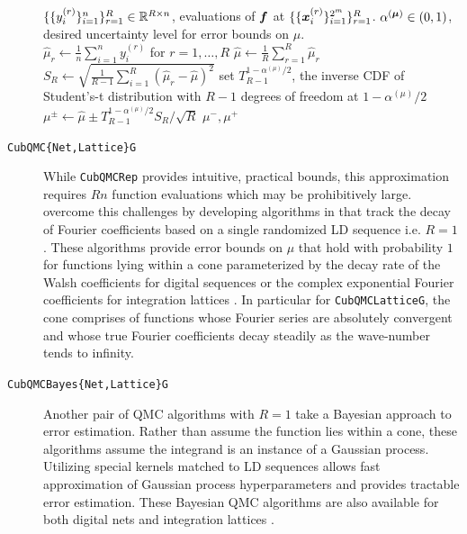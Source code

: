 \documentclass{article}[12pt]
\begin{document}
\begin{description}
\begin{algorithm}[h!]
\begin{algorithmic}
        \Require $\{\{y_i^{(r)}\}_{i=1}^n\}_{r=1}^R \in \bbR^{R \times n}$, evaluations of $\bf$ at $\{\{\bx_i^{(r)}\}_{i=1}^{2^m}\}_{r=1}^R$.
        \Require $\alpha^{(\bmu)} \in (0,1)$, desired uncertainty level for error bounds on $\mu$. \\
        \hrulefill
        \State $\hat{\mu}_r \gets \frac{1}{n} \sum_{i=1}^n y_i^{(r)}$ for $r=1,\dots,R$
        \State $\hat{\mu} \gets \frac{1}{R} \sum_{r=1}^R \hat{\mu}_r$
        \State $S_R \gets \sqrt{\frac{1}{R-1}\sum_{i=1}^R(\hat{\mu}_r - \hat{\mu})^2}$
        \State set $T_{R-1}^{1-\alpha^{(\mu)}/2}$, the inverse CDF of Student's-t distribution with $R-1$ degrees of freedom at $1-\alpha^{(\mu)}/2$
        \State $\mu^\pm \gets \hat{\mu} \pm T_{R-1}^{1-\alpha^{(\mu)}/2}S_R/\sqrt{R}$
        \State \Return $\mu^-,\mu^+$
        \end{algorithmic}
    \end{algorithm}
    \item[\texttt{CubQMC\{Net,Lattice\}G}] While \texttt{CubQMCRep} provides intuitive, practical bounds, this approximation requires $Rn$ function evaluations which may be prohibitively large. \citeauthor{cubqmclattice} overcome this challenges by developing algorithms in \cite{adaptive_qmc} that track the decay of Fourier coefficients based on a single randomized LD sequence i.e. $R=1$. These algorithms provide error bounds on $\mu$ that hold with probability $1$ for functions lying within a cone parameterized by the decay rate of the Walsh coefficients for digital sequences \cite{cubqmcsobol} or the complex exponential Fourier coefficients for integration lattices \cite{cubqmclattice}. In particular for \texttt{CubQMCLatticeG}, the cone comprises of functions whose Fourier series are absolutely convergent and whose true Fourier coefficients decay steadily as the wave-number tends to infinity.
    \item[\texttt{CubQMCBayes\{Net,Lattice\}G}] Another pair of QMC algorithms with $R=1$ take a Bayesian approach to error estimation. Rather than assume the function lies within a cone, these algorithms assume the integrand is an instance of a Gaussian process. 
    Utilizing special kernels matched to LD sequences allows fast approximation of Gaussian process hyperparameters and provides tractable error estimation. These Bayesian QMC algorithms are also available for both digital nets \cite{JagThesis19a} and integration lattices  \cite{cubqmcbayeslattice}. 
\end{description}
\end{document}
